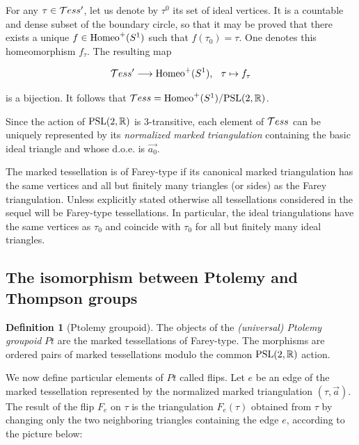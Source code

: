 \documentclass[twoside]{irmaems}
\theoremstyle{plain}
\theoremstyle{definition}
\newtheorem{definition}{Definition}[section]
\theoremstyle{remark}
\newcommand{\R}{{\mathbb{R}}}
\begin{document}
\vspace{0.1cm}\noindent 
For any $\tau\in {\cal T}ess'$, let us denote by $\tau^0$ its set of ideal vertices. It is a countable and dense subset of the boundary circle, so that it may be proved
 that there exists 
a unique $f\in {\rm Homeo}^+(S^1)$ such that  $f(\tau_0)=\tau$. One denotes this homeomorphism 
 $f_{\tau}$. The resulting map

$${\cal T}ess'\longrightarrow  {\rm Homeo}^+(S^1),\;\;\, \tau\mapsto f_{\tau}$$

\noindent is a bijection. It follows that  ${\cal T}ess={\rm Homeo}^+(S^1)/{\rm PSL}(2,\R)$.


 
\vspace{0.2cm}
\noindent 
Since the action of ${\rm PSL}(2,\R)$ is 3-transitive, each element of ${\cal T}ess$ 
can be uniquely represented by its {\em normalized marked triangulation} 
containing the basic ideal triangle and whose d.o.e. is $\vec{a_0}$. 

\vspace{0.2cm}
\noindent 
The marked tessellation is of Farey-type if its canonical marked triangulation 
has the same vertices  and all but finitely many triangles (or sides) as the Farey triangulation. 
Unless explicitly stated otherwise all tessellations considered 
in the sequel will be Farey-type tessellations.  In particular, 
the ideal triangulations have the same vertices as $\tau_0$ and coincide 
with $\tau_0$ for all but finitely many ideal triangles.









\subsection{The isomorphism between Ptolemy and Thompson groups}\label{IKS}



 
\begin{definition}[Ptolemy groupoid]
The objects of the {\em (universal) Ptolemy groupoid}
 $Pt$ are the 
marked tessellations of Farey-type. The morphisms 
are ordered pairs of marked tessellations modulo the common ${\rm PSL}(2,\R)$ 
action. 
\end{definition}




\vspace{0.2cm}
\noindent 
We now define  particular elements of $Pt$ called flips.  
Let $e$ be an edge of the marked tessellation represented by 
the normalized marked triangulation  $(\tau, \vec{a})$.  
The result of the flip $F_e$ on $\tau$ is the triangulation
$F_e(\tau)$ obtained  from $\tau$ by changing only 
the two neighboring triangles containing the edge $e$, according 
to the picture below: 
\end{document}
